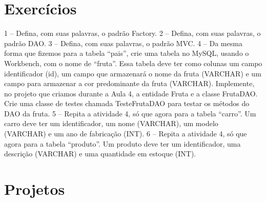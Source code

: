 \section{Exercícios}

1 – Defina, com suas palavras, o padrão Factory.
2 – Defina, com suas palavras, o padrão DAO.
3 – Defina, com suas palavras, o padrão MVC.
4 – Da mesma forma que fizemos para a tabela “pais”, crie uma tabela no MySQL, usando o Workbench, com o nome de “fruta”. Essa tabela deve ter como colunas um campo identificador (id), um campo que armazenará o nome da fruta (VARCHAR) e um campo para armazenar a cor predominante da fruta (VARCHAR). Implemente, no projeto que criamos durante a Aula 4, a entidade Fruta e a classe FrutaDAO. Crie uma classe de testes chamada TesteFrutaDAO para testar os métodos do DAO da fruta. 
5 – Repita a atividade 4, só que agora para a tabela “carro”. Um carro deve ter um identificador, um nome (VARCHAR), um modelo (VARCHAR) e um ano de fabricação (INT).
6 – Repita a atividade 4, só que agora para a tabela “produto”. Um produto deve ter um identificador, uma descrição (VARCHAR) e uma quantidade em estoque (INT).


\section{Projetos}